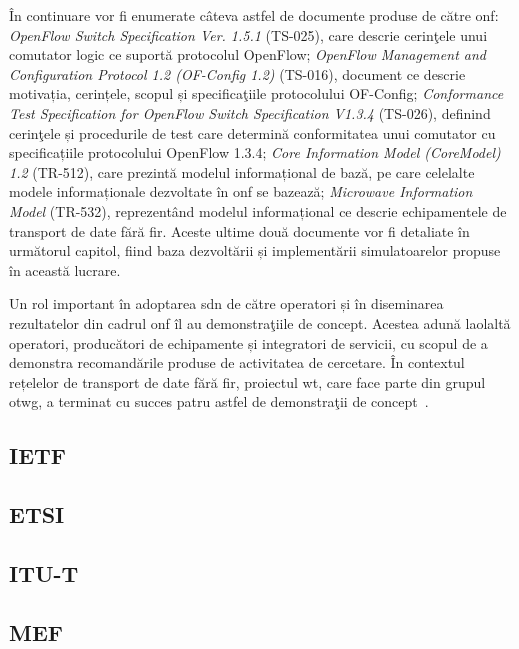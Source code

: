 În continuare vor fi enumerate câteva astfel de documente produse de către \gls{onf}: \textit{OpenFlow Switch Specification Ver. 1.5.1} (TS-025), care descrie cerinţele unui comutator logic ce suportă protocolul OpenFlow; \textit{OpenFlow Management	and	Configuration Protocol 1.2 (OF-Config 1.2)} (TS-016), document ce descrie motivația, cerințele, scopul și specificaţiile protocolului OF-Config; \textit{Conformance Test Specification for OpenFlow Switch Specification V1.3.4} (TS-026), definind cerinţele și procedurile de test care determină conformitatea unui comutator cu specificațiile protocolului OpenFlow 1.3.4; \textit{Core Information Model (CoreModel) 1.2} (TR-512), care prezintă modelul informațional de bază, pe care celelalte modele informaționale dezvoltate în \gls{onf} se bazează; \textit{Microwave Information Model} (TR-532), reprezentând modelul informațional ce descrie echipamentele de transport de date fără fir. Aceste ultime două documente vor fi detaliate în următorul capitol, fiind baza dezvoltării și implementării simulatoarelor propuse în această lucrare.

Un rol important în adoptarea \gls{sdn} de către operatori și în diseminarea rezultatelor din cadrul \gls{onf} îl au demonstraţiile de concept. Acestea adună laolaltă operatori, producători de echipamente și integratori de servicii, cu scopul de a demonstra recomandările produse de activitatea de cercetare. În contextul rețelelor de transport de date fără fir, proiectul \gls{wt}, care face parte din grupul \gls{otwg}, a terminat cu succes patru astfel de demonstraţii de concept~\cite{onf2015_poc1, onf2016_poc2, onf2016_poc3}.

\subsection{IETF}

\subsection{ETSI}

\subsection{ITU-T}

\subsection{MEF}